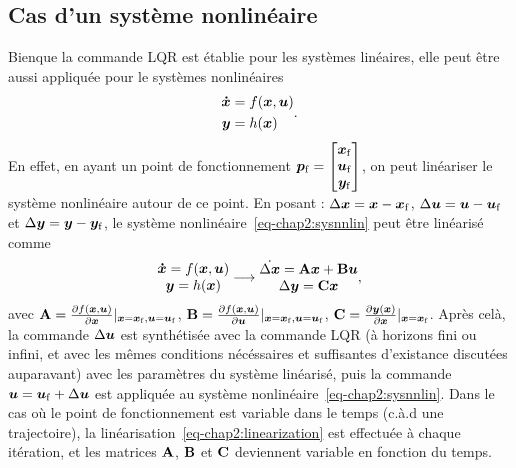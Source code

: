 \subsection{Cas d'un système nonlinéaire}
Bienque la commande LQR est établie pour les systèmes linéaires, elle peut être aussi appliquée pour le systèmes nonlinéaires
\begin{align}\label{eq-chap2:sysnnlin}
	\begin{split}
		\bm{\dot{x}} &= f(\bm{x},\bm{u})\\
		\bm{y} &=h(\bm{x})
	\end{split}.
\end{align}
 En effet, en ayant un point de fonctionnement $\bm{p}_{\rm f} = \begin{bmatrix}
\bm{x}_{\rm f} \\ \bm{u}_{\rm f} \\ \bm{y}_{\rm f}
\end{bmatrix}$, on peut linéariser le système nonlinéaire autour de ce point. En posant : $\Delta\bm{x} = \bm{x} - \bm{x}_{\rm f}$, $ \Delta\bm{u} = \bm{u} - \bm{u}_{\rm f}$ et $\Delta\bm{y} = \bm{y}-\bm{y}_{\rm f}$, le système nonlinéaire~\eqref{eq-chap2:sysnnlin} peut être linéarisé comme
\begin{align}\label{eq-chap2:linearization}
\begin{matrix}
	\bm{\dot{x}} = f(\bm{x},\bm{u})\\
	\bm{y} =h(\bm{x})
\end{matrix} \longrightarrow 
\begin{matrix}
	\boldmath{\dot{\Delta\bm{x}}} = \mathbf{A} \bm{x} + \mathbf{B}\bm{u}\\
	\Delta\bm{y} =\mathbf{C}\bm{x}
\end{matrix},	
\end{align}
avec $\mathbf{A}=\frac{\partial f(\bm{x},\bm{u})}{\partial\bm{x}}{|_{\bm{x}=\bm{x}_{\rm f},\bm{u}=\bm{u}_{\rm f}}}$,  $\mathbf{B}=\frac{\partial f(\bm{x},\bm{u})}{\partial\bm{u}}{|_{\bm{x}=\bm{x}_{\rm f},\bm{u}=\bm{u}_{\rm f}}}$,  $\mathbf{C}=\frac{\partial \bm{y}(\bm{x})}{\partial\bm{x}}{|_{\bm{x}=\bm{x}_{\rm f}}}$. Après celà, la commande $\Delta\bm{u}$ est synthétisée avec la commande LQR (à horizons fini ou infini, et avec les mêmes conditions nécéssaires et suffisantes d'existance discutées auparavant) avec les paramètres du système linéarisé, puis la commande $\bm{u}=\bm{u}_{\rm f}+\Delta\bm{u}$ est appliquée au système nonlinéaire~\eqref{eq-chap2:sysnnlin}. Dans le cas où le point de fonctionnement est variable dans le temps (c.à.d une trajectoire), la linéarisation~\eqref{eq-chap2:linearization} est effectuée à chaque itération, et les matrices $\mathbf{A}$, $\mathbf{B}$ et $\mathbf{C}$ deviennent variable en fonction du temps.
